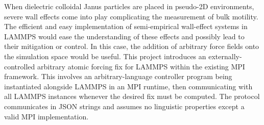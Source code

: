 
When dielectric colloidal Janus particles are placed in
pseudo-2D environments, severe wall effects come into play
complicating the measurement of bulk motility. The efficient and
easy implementation of semi-empirical wall-effect systems in
LAMMPS would ease the understanding of these effects and
possibly lead to their mitigation or control. In this case, the
addition of arbitrary force fields onto the simulation space
would be useful. This project introduces an
externally-controlled arbitrary atomic forcing fix for LAMMPS
within the existing MPI framework. This involves an
arbitrary-language controller program being instantiated
alongside LAMMPS in an MPI runtime, then communicating with all
LAMMPS instances whenever the desired fix must be computed. The
protocol communicates in JSON strings and assumes no linguistic
properties except a valid MPI implementation.
